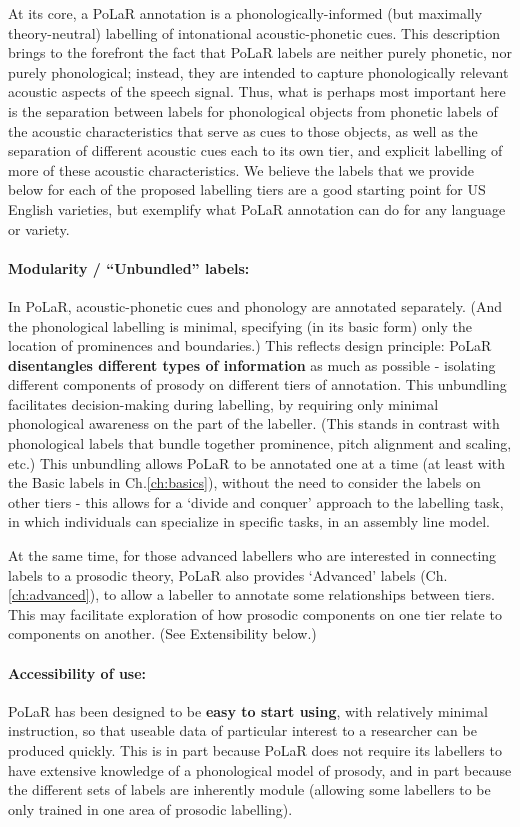 \documentclass[11pt, twoside]{memoir}
\begin{document}
At its core, a PoLaR annotation is a phonologically-informed (but maximally theory-neutral) labelling of intonational acoustic-phonetic cues. This description brings to the forefront the fact that PoLaR labels are neither purely phonetic, nor purely phonological; instead, they are intended to capture phonologically relevant acoustic aspects of the speech signal. Thus, what is perhaps most important here is the separation between labels for phonological objects from phonetic labels of the acoustic characteristics that serve as cues to those objects, as well as the separation of different acoustic cues each to its own tier, and explicit labelling of more of these acoustic characteristics. We believe the labels that we provide below for each of the proposed labelling tiers are a good starting point for US English varieties, but exemplify what PoLaR annotation can do for any language or variety.

\paragraph{Modularity / “Unbundled” labels:}
In PoLaR, acoustic-phonetic cues and phonology are annotated separately. (And the phonological labelling is minimal, specifying (in its basic form) only the location of prominences and boundaries.) This reflects design principle: PoLaR \textbf{disentangles different types of information} as much as possible - isolating different components of prosody on different tiers of annotation. This unbundling facilitates decision-making during labelling, by requiring only minimal phonological awareness on the part of the labeller. (This stands in contrast with phonological labels that bundle together prominence, pitch alignment and scaling, etc.) This unbundling allows PoLaR to be annotated one at a time (at least with the Basic labels in Ch.\ref{ch:basics}), without the need to consider the labels on other tiers - this allows for a ‘divide and conquer’ approach to the labelling task, in which individuals can specialize in specific tasks, in an assembly line model.

At the same time, for those advanced labellers who are interested in connecting labels to a prosodic theory, PoLaR also provides ‘Advanced’ labels (Ch.\ref{ch:advanced}), to allow a labeller to annotate some relationships between tiers. This may facilitate exploration of how prosodic components on one tier relate to components on another. (See Extensibility below.)

\paragraph{Accessibility of use:}
PoLaR has been designed to be \textbf{easy to start using}, with relatively minimal instruction, so that useable data of particular interest to a researcher can be produced quickly.  This is in part because PoLaR does not require its labellers to have extensive knowledge of a phonological model of prosody, and in part because the different sets of labels are inherently module (allowing some labellers to be only trained in one area of prosodic labelling).
\end{document}
